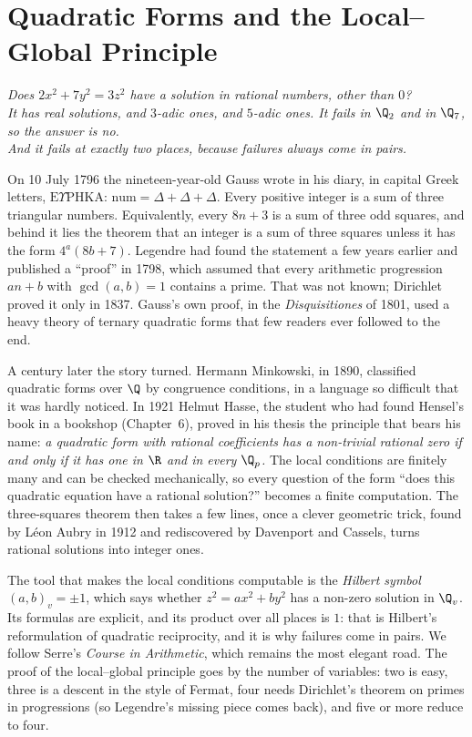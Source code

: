 \chapter{Quadratic Forms and the Local--Global Principle}
\begin{center}\itshape
Does $2x^2+7y^2=3z^2$ have a solution in rational numbers, other than $0$?\\
It has real solutions, and $3$-adic ones, and $5$-adic ones. It fails in $\Q_2$ and in $\Q_7$, so the answer is no.\\
And it fails at exactly two places, because failures always come in pairs.
\end{center}

On 10 July 1796 the nineteen-year-old Gauss wrote in his diary, in capital Greek letters, $\text{E}\Upsilon\text{PHKA}$:
$\text{num}=\Delta+\Delta+\Delta$. Every positive integer is a sum of three triangular numbers. Equivalently, every
$8n+3$ is a sum of three odd squares, and behind it lies the theorem that an integer is a sum of three squares unless it
has the form $4^a(8b+7)$. Legendre had found the statement a few years earlier and published a ``proof'' in 1798, which
assumed that every arithmetic progression $an+b$ with $\gcd(a,b)=1$ contains a prime. That was not known; Dirichlet proved
it only in 1837. Gauss's own proof, in the \emph{Disquisitiones} of 1801, used a heavy theory of ternary quadratic forms that
few readers ever followed to the end.

A century later the story turned. Hermann Minkowski, in 1890, classified quadratic forms over $\Q$ by congruence conditions,
in a language so difficult that it was hardly noticed. In 1921 Helmut Hasse, the student who had found Hensel's book in a
bookshop (Chapter~6), proved in his thesis the principle that bears his name: \emph{a quadratic form with rational
coefficients has a non-trivial rational zero if and only if it has one in $\R$ and in every $\Q_p$.} The local conditions
are finitely many and can be checked mechanically, so every question of the form ``does this quadratic equation have a
rational solution?'' becomes a finite computation. The three-squares theorem then takes a few lines, once a clever
geometric trick, found by L\'eon Aubry in 1912 and rediscovered by Davenport and Cassels, turns rational solutions into
integer ones.

The tool that makes the local conditions computable is the \emph{Hilbert symbol} $(a,b)_v=\pm1$, which says whether
$z^2=ax^2+by^2$ has a non-zero solution in $\Q_v$. Its formulas are explicit, and its product over all places is $1$:
that is Hilbert's reformulation of quadratic reciprocity, and it is why failures come in pairs. We follow Serre's
\emph{Course in Arithmetic}, which remains the most elegant road. The proof of the local--global principle goes by the
number of variables: two is easy, three is a descent in the style of Fermat, four needs Dirichlet's theorem on primes in
progressions (so Legendre's missing piece comes back), and five or more reduce to four.

